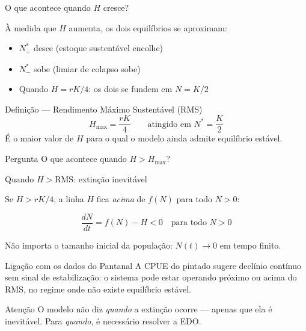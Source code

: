 \documentclass[12pt]{beamer}
\begin{document}
\begin{frame}{O que acontece quando $H$ cresce?}

  À medida que $H$ aumenta, os dois equilíbrios se aproximam:

  \bigskip
  \begin{itemize}
    \item $N^*_+$ desce (estoque sustentável encolhe)
    \item $N^*_-$ sobe (limiar de colapso sobe)
    \item Quando $H = rK/4$: os dois se fundem em $N = K/2$
  \end{itemize}

  \bigskip
  \begin{exampleblock}{Definição — Rendimento Máximo Sustentável (RMS)}
    \[
      H_{\max} = \frac{rK}{4}
      \qquad \text{atingido em } N^* = \frac{K}{2}
    \]
    É o maior valor de $H$ para o qual o modelo ainda admite equilíbrio estável.
  \end{exampleblock}

  \bigskip
  \begin{alertblock}{Pergunta}
    O que acontece quando $H > H_{\max}$?
  \end{alertblock}

\end{frame}

\begin{frame}{Quando $H > \text{RMS}$: extinção inevitável}

  Se $H > rK/4$, a linha $H$ fica \emph{acima} de $f(N)$ para todo $N > 0$:

  \[
    \frac{dN}{dt} = f(N) - H < 0 \quad \text{para todo } N > 0
  \]

  \bigskip
  Não importa o tamanho inicial da população:
  $N(t) \to 0$ em tempo finito.

  \bigskip
  \begin{block}{Ligação com os dados do Pantanal}
    A CPUE do pintado sugere declínio contínuo sem sinal de
    estabilização: o sistema pode estar operando próximo ou
    acima do RMS, no regime onde não existe equilíbrio estável.
  \end{block}

  \bigskip
  \begin{alertblock}{Atenção}
    O modelo não diz \emph{quando} a extinção ocorre ---
    apenas que ela é inevitável. Para \emph{quando}, é necessário
    resolver a EDO.
  \end{alertblock}

\end{frame}
\end{document}
